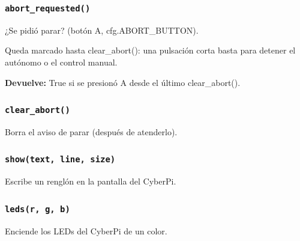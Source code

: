 \subsubsection{\texttt{abort\_\allowbreak{}requested()}}\label{fn:hal:abort-requested}
\noindent ¿Se pidió parar? (botón A, cfg.ABORT\_BUTTON).

Queda marcado hasta clear\_abort(): una pulsación corta basta para detener el autónomo o el control manual.

\noindent\textbf{Devuelve:} True si se presionó A desde el último clear\_abort().\par

\subsubsection{\texttt{clear\_\allowbreak{}abort()}}\label{fn:hal:clear-abort}
\noindent Borra el aviso de parar (después de atenderlo).


\subsubsection{\texttt{show(text, line, size)}}\label{fn:hal:show}
\noindent Escribe un renglón en la pantalla del CyberPi.

\par{}\par\smallskip

\subsubsection{\texttt{leds(r, g, b)}}\label{fn:hal:leds}
\noindent Enciende los LEDs del CyberPi de un color.

\par{}\par\smallskip

